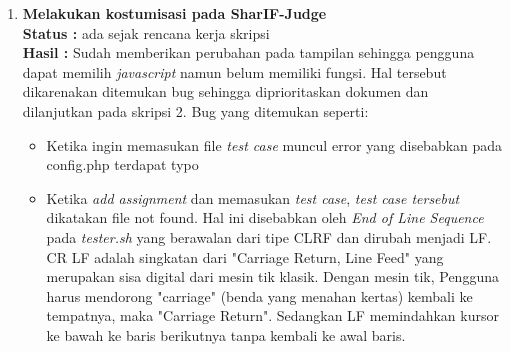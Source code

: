 \documentclass[a4paper,twoside]{article}
\begin{document}
\begin{enumerate}
\begin{itemize}
		    \end{itemize}

		\item \textbf{Melakukan kostumisasi pada SharIF-Judge}\\
		{\bf Status :} ada sejak rencana kerja skripsi \\
		{\bf Hasil :} Sudah memberikan perubahan pada tampilan sehingga pengguna dapat memilih \textit{javascript} namun belum memiliki fungsi. Hal tersebut dikarenakan ditemukan bug  sehingga diprioritaskan dokumen dan dilanjutkan pada skripsi 2. Bug yang ditemukan seperti: 
		    \begin{itemize}
		        \item Ketika ingin memasukan file \textit{test case} muncul error yang disebabkan pada config.php terdapat typo
		        \item Ketika \textit{add assignment} dan memasukan \textit{test case}, \textit{test case tersebut} dikatakan file not found. Hal ini disebabkan oleh \textit{End of Line Sequence} pada \textit{tester.sh} yang berawalan dari tipe CLRF dan dirubah menjadi LF. CR LF adalah singkatan dari "Carriage Return, Line Feed" yang merupakan sisa digital dari mesin tik klasik. Dengan mesin tik, Pengguna harus mendorong "carriage" (benda yang menahan kertas) kembali ke tempatnya, maka "Carriage Return". Sedangkan LF memindahkan kursor ke bawah ke baris berikutnya tanpa kembali ke awal baris.
		    \end{itemize}
		   

\end{enumerate}
\end{document}
